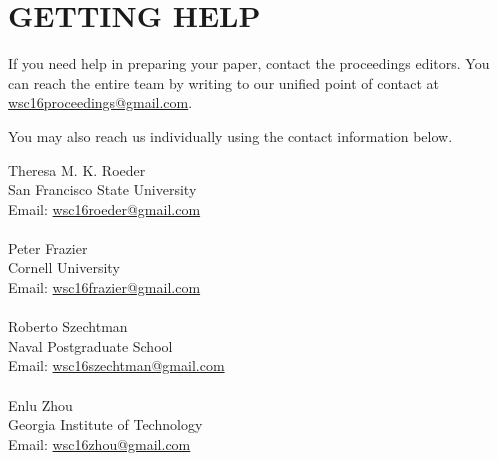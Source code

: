 \documentclass{wscposterproc}
\begin{document}
\section{GETTING HELP}
If you need help in preparing your paper, contact the proceedings editors. You can reach the entire team by writing to our unified point of contact at \href{mailto://wsc16proceedings@gmail.com}{wsc16proceedings@gmail.com}.

You may also reach us individually using the contact information below.

\vspace{6pt}

\noindent Theresa M. K. Roeder\\
San Francisco State University\\
Email: \href{mailto://wsc16roeder@gmail.com}{wsc16roeder@gmail.com}\\
\\
Peter Frazier\\
Cornell University\\
Email: \href{mailto://wsc16frazier@gmail.com}{wsc16frazier@gmail.com}\\
\\
Roberto Szechtman\\
Naval Postgraduate School\\
Email: \href{mailto://wsc16szechtman@gmail.com}{wsc16szechtman@gmail.com}\\
\\
Enlu Zhou\\
Georgia Institute of Technology\\
Email: \href{mailto://wsc16zhou@gmail.com}{wsc16zhou@gmail.com}\\
\\


\end{document}
